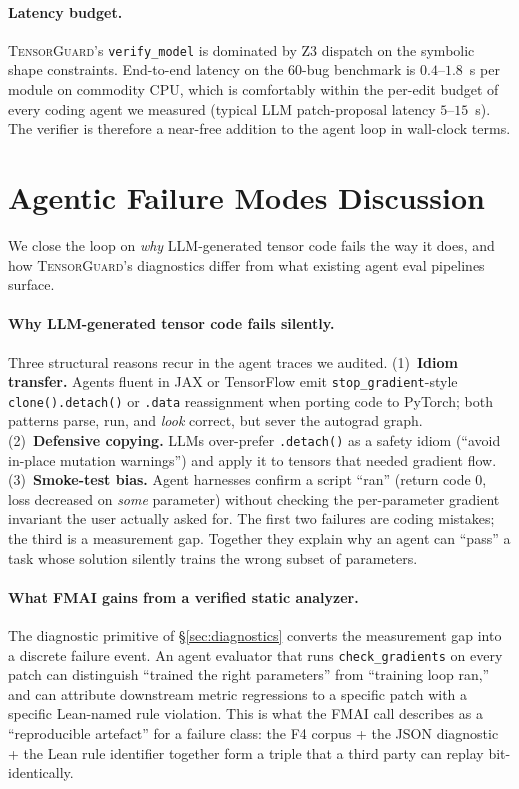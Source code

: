 \documentclass{article}
\begin{document}
\paragraph{Latency budget.}
\textsc{TensorGuard}'s \texttt{verify\_model} is dominated by Z3
dispatch on the symbolic shape constraints. End-to-end latency
on the $60$-bug benchmark is $0.4$--$1.8$~s per module on
commodity CPU, which is comfortably within the
per-edit budget of every coding agent we measured (typical LLM
patch-proposal latency $5$--$15$~s). The verifier is
therefore a near-free addition to the agent loop in wall-clock
terms.

\section{Agentic Failure Modes Discussion}
\label{sec:agentfm}

We close the loop on \emph{why} LLM-generated tensor code fails the way
it does, and how \textsc{TensorGuard}'s diagnostics differ from what
existing agent eval pipelines surface.

\paragraph{Why LLM-generated tensor code fails silently.}
Three structural reasons recur in the agent traces we audited.
(1)~\textbf{Idiom transfer.} Agents fluent in JAX or TensorFlow
emit \texttt{stop\_gradient}-style \texttt{clone().detach()} or
\texttt{.data} reassignment when porting code to PyTorch; both
patterns parse, run, and \emph{look} correct, but sever the
autograd graph. (2)~\textbf{Defensive copying.} LLMs over-prefer
\texttt{.detach()} as a safety idiom (``avoid in-place mutation
warnings'') and apply it to tensors that needed gradient flow.
(3)~\textbf{Smoke-test bias.} Agent harnesses confirm a script
``ran'' (return code 0, loss decreased on \emph{some} parameter)
without checking the per-parameter gradient invariant the user
actually asked for. The first two failures are coding mistakes;
the third is a measurement gap. Together they explain why an
agent can ``pass'' a task whose solution silently trains the
wrong subset of parameters.

\paragraph{What FMAI gains from a verified static analyzer.}
The diagnostic primitive of \S\ref{sec:diagnostics} converts the
measurement gap into a discrete failure event. An agent
evaluator that runs \texttt{check\_gradients} on every patch can
distinguish ``trained the right parameters'' from ``training loop
ran,'' and can attribute downstream metric regressions to a
specific patch with a specific Lean-named rule violation. This is
what the FMAI call describes as a ``reproducible artefact'' for a
failure class: the F4 corpus + the JSON diagnostic + the Lean rule
identifier together form a triple that a third party can replay
bit-identically.
\end{document}
